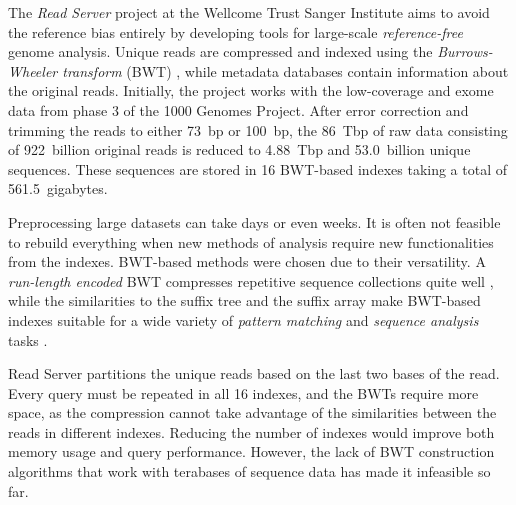 \documentclass[smallabstract,smallcaptions]{dccpaper}
\newcommand{\BWT}{\textsf{BWT}}
\begin{document}
The \emph{Read Server} project at the Wellcome Trust Sanger Institute aims to avoid the reference bias entirely by developing tools for large-scale \emph{reference-free} genome analysis. Unique reads are compressed and indexed using the \emph{Burrows-Wheeler transform} (\BWT) \cite{Burrows1994}, while metadata databases contain information about the original reads. Initially, the project works with the low-coverage and exome data from phase 3 of the 1000 Genomes Project. After error correction and trimming the reads to either 73~bp or 100~bp, the 86~Tbp of raw data consisting of 922~billion original reads is reduced to 4.88~Tbp and 53.0~billion unique sequences. These sequences are stored in 16 \BWT-based indexes \cite{Ferragina2005a} taking a total of 561.5~gigabytes.

Preprocessing large datasets can take days or even weeks. It is often not feasible to rebuild everything when new methods of analysis require new functionalities from the indexes. \BWT-based methods were chosen due to their versatility. A \emph{run-length encoded} \BWT{} compresses repetitive sequence collections quite well \cite{Maekinen2010}, while the similarities to the suffix tree and the suffix array make \BWT-based indexes suitable for a wide variety of \emph{pattern matching} and \emph{sequence analysis} tasks \cite{Ohlebusch2013,Maekinen2015}.

Read Server partitions the unique reads based on the last two bases of the read. Every query must be repeated in all 16 indexes, and the \BWT{}s require more space, as the compression cannot take advantage of the similarities between the reads in different indexes. Reducing the number of indexes would improve both memory usage and query performance. However, the lack of \BWT{} construction algorithms that work with terabases of sequence data has made it infeasible so far.
\end{document}
